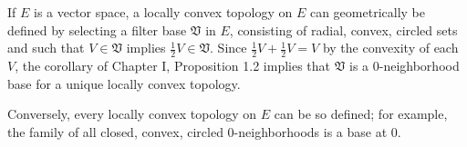 If $E$ is a vector space, a locally convex topology on $E$ can geometrically be defined by selecting a filter base $\mathfrak{V}$ in $E$, consisting of radial, convex, circled sets and such that $V \in \mathfrak{V}$ implies $\frac{1}{2}V \in \mathfrak{V}$. Since $\frac{1}{2}V + \frac{1}{2}V = V$ by the convexity of each $V$, the corollary of Chapter I, Proposition 1.2 implies that $\mathfrak{V}$ is a $0$-neighborhood base for a unique locally convex topology.

Conversely, every locally convex topology on $E$ can be so defined; for example, the family of all closed, convex, circled $0$-neighborhoods is a base at $0$.

